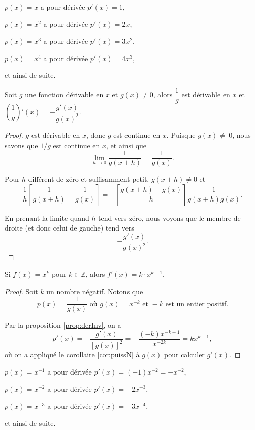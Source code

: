 \documentclass[a4paper,12pt]{article}
\begin{document}
\begin{exemple}
   \tcblower
   $p(x) = x$ a pour dérivée $p'(x) = 1$,
   
   $p(x) = x^2$ a pour dérivée $p'(x) = 2x$,
   
   $p(x) = x^3$ a pour dérivée $p'(x) = 3x^2$,
   
   $p(x) = x^4$ a pour dérivée $p'(x) = 4x^3$,
   
   et ainsi de suite.
\end{exemple}

\begin{prop}[label=prop:derInv]
   \tcblower
   Soit $g$ une fonction dérivable en $x$ et $g(x)\neq 0$, alors $\dfrac{1}{g}$ est dérivable en $x$ et $\left(\dfrac{1}{g}\right)'(x)=-\dfrac{g'(x)}{g(x)^2}$. 
   \medskip

   \begin{proof}
   	 $g$ est dérivable en $x$, donc $g$ est continue en $x$. Puisque $g(x)\neq~0$, nous savons que $1/g$ est continue en $x$, et ainsi que
   	$$\lim_{h \to 0} \frac{1}{g(x+h)} = \frac{1}{g(x)}.$$
   	
   	Pour $h$ différent de zéro et suffisamment petit, $g(x+h) \neq 0$ et
   	$$\frac{1}{h}\left[\frac{1}{g(x+h)} - \frac{1}{g(x)}\right] = -\left[\frac{g(x+h) - g(x)}{h}\right]\frac{1}{g(x+h)g(x)}.$$
   	
   	En prenant la limite quand $h$ tend vers zéro, nous voyons que le membre de droite (et donc celui de gauche) tend vers
   	$$-\frac{g'(x)}{g(x)^2}.$$
   \end{proof}
\end{prop}

\begin{coro}
   \tcblower
   Si $f(x)=x^k$ pour $k\in \mathbb{Z}$, alors $f'(x)=k\cdot x^{k-1}$.
   \medskip

   \begin{proof}
Soit $k$ un nombre négatif. Notons que
   	$$p(x) = \frac{1}{g(x)} \text{ où } g(x) = x^{-k} \text{ et } -k \text{ est un entier positif}.$$
   	
	Par la proposition \ref{prop:derInv}, on a
   	$$p'(x) = -\frac{g'(x)}{[g(x)]^2} = -\frac{(-k)x^{-k-1}}{x^{-2k}} = kx^{k-1},$$
	où on a appliqué le corollaire \ref{cor:puissN} à $g(x)$ pour calculer $g'(x)$.
   \end{proof}
\end{coro}

\begin{exemple}
   \tcblower
   $p(x) = x^{-1}$ a pour dérivée $p'(x) = (-1)x^{-2} = -x^{-2}$,
   
   $p(x) = x^{-2}$ a pour dérivée $p'(x) = -2x^{-3}$,
   
   $p(x) = x^{-3}$ a pour dérivée $p'(x) = -3x^{-4}$,
   
   et ainsi de suite.
\end{exemple}
\end{document}
